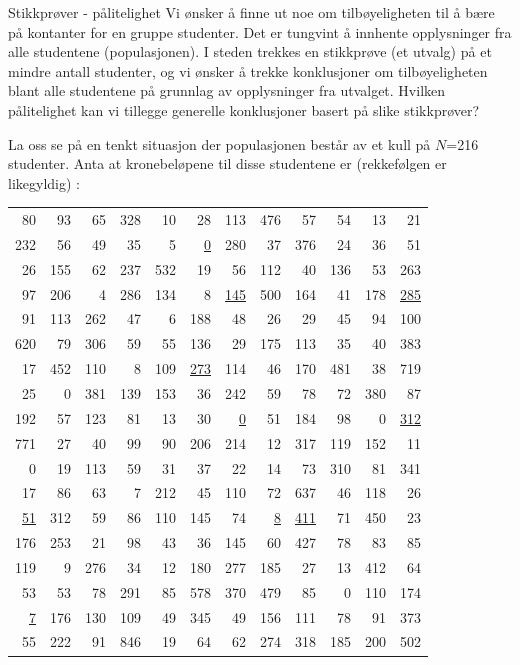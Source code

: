 \begin{eksempel}{Stikkprøver - pålitelighet}
Vi ønsker å finne ut noe om tilbøyeligheten til å bære på
kontanter for en gruppe studenter.  Det er tungvint
å innhente opplysninger fra alle studentene (populasjonen).  I     
steden trekkes en stikkprøve (et utvalg) på et mindre antall
studenter, og vi ønsker å trekke konklusjoner om tilbøyeligheten
blant alle studentene på grunnlag av opplysninger fra utvalget. 
Hvilken pålitelighet kan vi tillegge generelle konklusjoner
basert på slike stikkprøver?

La oss se på en tenkt situasjon der populasjonen består av et
kull på $N$=216 studenter.  Anta at kronebeløpene til disse
studentene er (rekkefølgen er likegyldig) :


\begin{center}                                                              
\begin{tabular}{|rrrrrr|rrrrrr|}   \hline
 80& 93& 65&328& 10& 28&113&476& 57& 54& 13& 21 \\
232& 56& 49& 35&  5& \underline{0}&280& 37&376& 24& 36& 51 \\
 26&155& 62&237&532& 19& 56&112& 40&136& 53&263 \\        
 97&206&  4&286&134&  8&\underline{145}&500&164& 41&178&\underline{285} \\
 91&113&262& 47&  6&188& 48& 26& 29& 45& 94&100 \\
620& 79&306& 59& 55&136& 29&175&113& 35& 40&383 \\ \hline                   
 17&452&110&  8&109&\underline{273}&114& 46&170&481& 38&719 \\
 25&  0&381&139&153& 36&242& 59& 78& 72&380& 87 \\
192& 57&123& 81& 13& 30&  \underline{0}& 51&184& 98&  0&\underline{312} \\
771& 27& 40& 99& 90&206&214& 12&317&119&152& 11 \\
  0& 19&113& 59& 31& 37& 22& 14& 73&310& 81&341 \\
 17& 86& 63&  7&212& 45&110& 72&637& 46&118& 26 \\ \hline
\underline{51}&312& 59& 86&110&145& 74&\underline{  8}&\underline{411}& 71&450& 23 \\
176&253& 21& 98& 43& 36&145& 60&427& 78& 83& 85 \\
119&  9&276& 34& 12&180&277&185& 27& 13&412& 64 \\
 53& 53& 78&291& 85&578&370&479& 85&  0&110&174 \\
\underline{ 7}&176&130&109& 49&345& 49&156&111& 78& 91&373 \\
 55&222& 91&846& 19& 64& 62&274&318&185&200&502 \\ \hline
 \end{tabular}
\end{center}
                                             

\end{eksempel}
